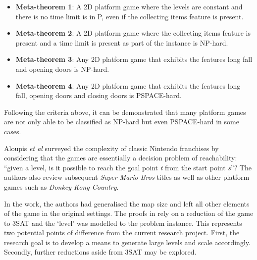 \documentclass[11pt, a4paper, oneside]{report} %
\begin{document}
\begin{itemize}

  \item \textbf{Meta-theorem 1}: A 2D platform game where the levels are constant and there is no
                                time limit is in P, even if the collecting items feature is present.

  \item \textbf{Meta-theorem 2}: A 2D platform game where the collecting items feature is present
                                 and a time limit is present as part of the instance is NP-hard.


  \item \textbf{Meta-theorem 3}: Any 2D platform game that exhibits the features long fall and
                                 opening doors is NP-hard.


  \item \textbf{Meta-theorem 4}: Any 2D platform game that exhibits the features long fall, opening
                                 doors and closing doors is PSPACE-hard.

\end{itemize}


Following the criteria above, it can be demonstrated that many platform games are not only able to be
classified as NP-hard but even PSPACE-hard in some cases.

Aloupis \textit{et al} \cite{Aloupis2012} surveyed the complexity of classic
Nintendo franchises by considering that the games are essentially a decision
problem of reachability: ``given a level, is it possible to reach the goal point
\textit{t} from the start point \textit{s}''? The authors also review subsequent
\textit{Super Mario Bros} titles as well as other platform games such as
\textit{Donkey Kong Country}.

In the work, the authors had generalised the map size and left all other
elements of the game in the original settings. The proofs in \cite{Aloupis2012}
rely on a reduction of the game to 3SAT and the `level' was modelled to the
problem instance. This represents two potential points of difference from the
current research project. First, the research goal is to develop a means to
generate large levels and scale accordingly. Secondly, further reductions aside
from 3SAT may be explored.  \\
\end{document}
